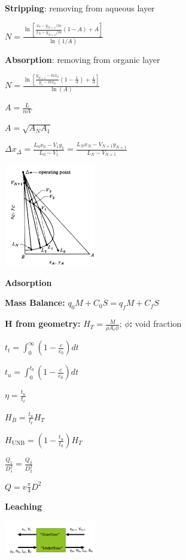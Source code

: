 \documentclass[12pt]{article}
\begin{document}
\begin{multicols}{2}
\textbf{Stripping}: removing from aqueous layer

$N=\frac{\ln\left[\frac{x_0-y_{N+1}/m}{x_N-y_{N+1}/m}\left(1-A\right)+A\right]}{\ln\left(1/A\right)}$

\textbf{Absorption}: removing from organic layer

$N=\frac{\ln\left[\frac{y_{N+1}-mx_0}{y_1-mx_0}\left(1-\frac{1}{A}\right)+\frac{1}{A}\right]}{\ln\left(A\right)}$

$A=\frac{L}{mV}$

$A=\sqrt{A_NA_1}$

$\Delta x_\Delta=\frac{L_0x_0-V_1y_1}{L_0-V_1}=\frac{L_Nx_N-V_{N+1}y_{N+1}}{L_N-V_{N+1}}$

\begin{center}
    \includegraphics[width=0.3\textwidth]{ll_stages.png}
\end{center}

\textbf{Adsorption}

\textbf{Mass Balance:}  $q_0M+C_0S=q_fM+C_fS$

\textbf{H from geometry:} $H_T=\frac{M}{\rho A_c \phi}$; \textbf{$\phi$:} void fraction

$t_t=\int_0^\infty\left(1-\frac{c}{c_0}\right)dt$ 

$t_u=\int_0^{t_b}\left(1-\frac{c}{c_0}\right)dt$ 

$\eta=\frac{t_u}{t_t}$ 

$H_B=\frac{t_u}{t_t}H_T$ 

$H_{\text{UNB}}=\left(1-\frac{t_u}{t_b}\right)H_T$ 

$\frac{Q_1}{D_1^2}=\frac{Q_2}{D_2^2}$ 

$Q=v\frac{\pi}{4}D^2$

\textbf{Leaching}

\begin{center}
    \includegraphics[width=0.3\textwidth]{leach_diag.png}
\end{center}


\end{multicols}
\end{document}

